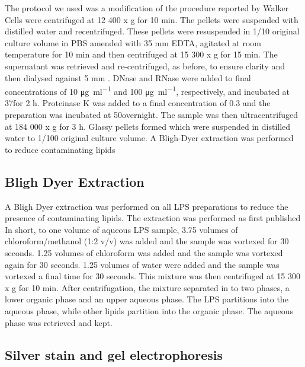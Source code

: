   The protocol we used was a modification of the procedure reported by Walker
  \etal\! Cells were centrifuged at 12 400 x g for 10 min. The pellets were
  suspended with distilled water and recentrifuged. These pellets were resuspended in 1/10 original
  culture volume in \ac{PBS} amended with 35 \si{\milli\meter} \ac{EDTA}, agitated
  at room temperature for 10 min and then centrifuged at 15 300 x g for 15 min. The supernatant was
  retrieved and re-centrifuged, as before, to ensure clarity and then dialysed against 5
  \si{\milli\meter} . DNase and RNase were added to final concentrations of 10
  \si{\micro\gram\per\milli\litre} and 100 \si{\micro\gram\per\milli\litre}\!, respectively, and
  incubated at 37\cel for 2 h. Proteinase K was added to a final concentration of 0.3 \mgperml and
  the preparation was incubated at 50\cel overnight. The sample was then ultracentrifuged at 184 000
  x g for 3 h. Glassy pellets formed which were suspended in distilled water to 1/100 original
  culture volume. A Bligh-Dyer extraction was performed to reduce contaminating
  lipids

	\subsection{Bligh Dyer Extraction} %
	\label{sub:bligh_dyer_extraction}
  A Bligh Dyer extraction was performed on all \ac{LPS} preparations to reduce the presence of
  contaminating lipids. The extraction was performed as first published In
  short, to one volume of aqueous \ac{LPS} sample, 3.75 volumes of chloroform/methanol (1:2 v/v) was
  added and the sample was vortexed for 30 seconds. 1.25 volumes of chloroform was added and the
  sample was vortexed again for 30 seconds. 1.25 volumes of water were added and the sample was
  vortexed a final time for 30 seconds. This mixture was then centrifuged at 15 300 x g for 10
  min. After centrifugation, the mixture separated in to two phases, a lower organic phase and an
  upper aqueous phase. The \ac{LPS} partitions into the aqueous phase, while other lipids partition
  into the organic phase. The aqueous phase was retrieved and kept.

	\subsection{Silver stain and gel electrophoresis} %
	\label{sub:gel_electrophoresis}

